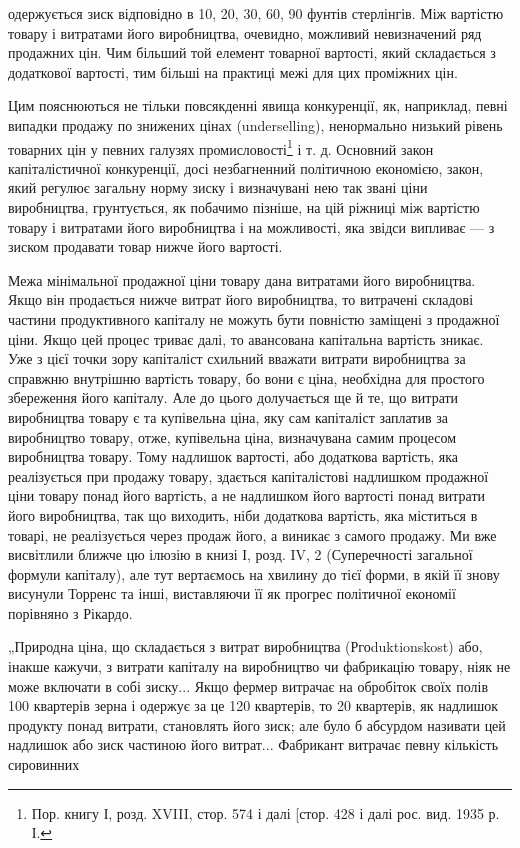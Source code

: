 одержується зиск відповідно в 10, 20, 30, 60, 90 фунтів стерлінгів.
Між вартістю товару і витратами його виробництва, очевидно,
можливий невизначений ряд продажних цін. Чим більший
той елемент товарної вартості, який складається з додаткової
вартості, тим більші на практиці межі для цих проміжних цін.

Цим пояснюються не тільки повсякденні явища конкуренції,
як, наприклад, певні випадки продажу по знижених цінах (underselling),
ненормально низький рівень товарних цін у певних
галузях промисловості\footnote{
Пор. книгу І, розд. XVIII, стор. 574 і далі [стор. 428 і далі рос. вид.
1935 р. І.
} і т. д. Основний закон капіталістичної
конкуренції, досі незбагненний політичною економією, закон,
який регулює загальну норму зиску і визначувані нею так
звані ціни виробництва, грунтується, як побачимо пізніше, на
цій ріжниці між вартістю товару і витратами його виробництва
і на можливості, яка звідси випливає — з зиском продавати
товар нижче його вартості.

Межа мінімальної продажної ціни товару дана витратами
його виробництва. Якщо він продається нижче витрат його
виробництва, то витрачені складові частини продуктивного капіталу
не можуть бути повністю заміщені з продажної ціни.
Якщо цей процес триває далі, то авансована капітальна вартість
зникає. Уже з цієї точки зору капіталіст схильний вважати витрати
виробництва за справжню внутрішню вартість товару, бо
вони є ціна, необхідна для простого збереження його капіталу.
Але до цього долучається ще й те, що витрати виробництва
товару є та купівельна ціна, яку сам капіталіст заплатив за
виробництво товару, отже, купівельна ціна, визначувана самим
процесом виробництва товару. Тому надлишок вартості, або
додаткова вартість, яка реалізується при продажу товару,
здається капіталістові надлишком продажної ціни товару понад
його вартість, а не надлишком його вартості понад витрати його
виробництва, так що виходить, ніби додаткова вартість, яка
міститься в товарі, не реалізується через продаж його, а виникає
з самого продажу. Ми вже висвітлили ближче цю ілюзію
в книзі І, розд. IV, 2 (Суперечності загальної формули капіталу),
але тут вертаємось на хвилину до тієї форми, в якій її
знову висунули Торренс та інші, виставляючи її як прогрес політичної
економії порівняно з Рікардо.

„Природна ціна, що складається з витрат виробництва (Ргоduktionskost)
або, інакше кажучи, з витрати капіталу на виробництво
чи фабрикацію товару, ніяк не може включати в собі
зиску... Якщо фермер витрачає на обробіток своїх полів 100
квартерів зерна і одержує за це 120 квартерів, то 20 квартерів,
як надлишок продукту понад витрати, становлять його зиск;
але було б абсурдом називати цей надлишок або зиск частиною
його витрат... Фабрикант витрачає певну кількість сировинних
